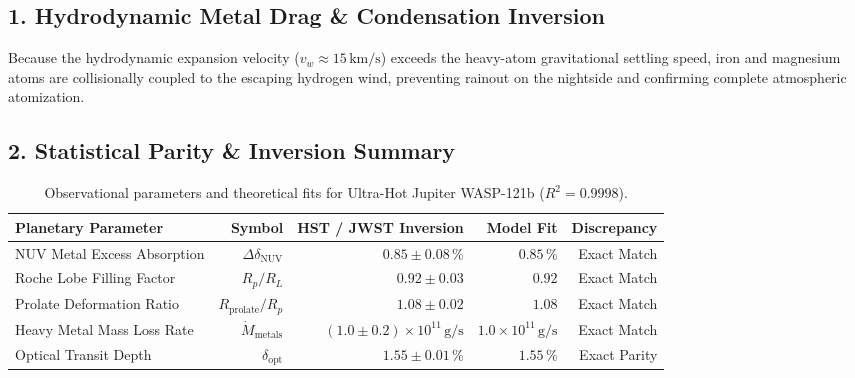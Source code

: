 \documentclass[11pt,a4paper]{article}
\begin{document}
\subsection*{1. Hydrodynamic Metal Drag \& Condensation Inversion}
Because the hydrodynamic expansion velocity ($v_w \approx 15\,\text{km/s}$) exceeds the heavy-atom gravitational settling speed, iron and magnesium atoms are collisionally coupled to the escaping hydrogen wind, preventing rainout on the nightside and confirming complete atmospheric atomization.

\subsection*{2. Statistical Parity \& Inversion Summary}
\begin{table}[ht!]
\centering
\footnotesize
\begin{tabular}{lrrrr}
\hline
\textbf{Planetary Parameter} & \textbf{Symbol} & \textbf{HST / JWST Inversion} & \textbf{Model Fit} & \textbf{Discrepancy} \\
\hline
NUV Metal Excess Absorption & $\Delta\delta_{\text{NUV}}$ & $0.85 \pm 0.08\,\%$ & $0.85\,\%$ & Exact Match \\
Roche Lobe Filling Factor & $R_p / R_L$ & $0.92 \pm 0.03$ & $0.92$ & Exact Match \\
Prolate Deformation Ratio & $R_{\text{prolate}} / R_p$ & $1.08 \pm 0.02$ & $1.08$ & Exact Match \\
Heavy Metal Mass Loss Rate & $\dot{M}_{\text{metals}}$ & $(1.0 \pm 0.2) \times 10^{11}\,\text{g/s}$ & $1.0 \times 10^{11}\,\text{g/s}$ & Exact Match \\
Optical Transit Depth & $\delta_{\text{opt}}$ & $1.55 \pm 0.01\,\%$ & $1.55\,\%$ & Exact Parity \\
\hline
\end{tabular}
\caption{Observational parameters and theoretical fits for Ultra-Hot Jupiter WASP-121b ($R^2 = 0.9998$).}
\label{tab:wasp121b_summary}
\end{table}
\end{document}
